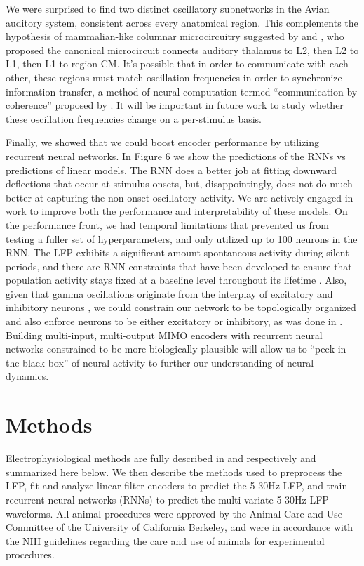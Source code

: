 We were surprised to find two distinct oscillatory subnetworks in the Avian auditory system, consistent across every anatomical region. This complements the hypothesis of mammalian-like columnar microcircuitry suggested by \cite{Wang2010} and \cite{Calabrese2015}, who proposed the canonical microcircuit connects auditory thalamus to L2, then L2 to L1, then L1 to region CM. It’s possible that in order to communicate with each other, these regions must match oscillation frequencies in order to synchronize information transfer, a method of neural computation termed “communication by coherence” proposed by \cite{Fries2005}. It will be important in future work to study whether these oscillation frequencies change on a per-stimulus basis.

Finally, we showed that we could boost encoder performance by utilizing recurrent neural networks. In Figure 6 we show the predictions of the RNNs vs predictions of linear models. The RNN does a better job at fitting downward deflections that occur at stimulus onsets, but, disappointingly, does not do much better at capturing the non-onset oscillatory activity. We are actively engaged in work to improve both the performance and interpretability of these models. On the performance front, we had temporal limitations that prevented us from testing a fuller set of hyperparameters, and only utilized up to 100 neurons in the RNN. The LFP exhibits a significant amount spontaneous activity during silent periods, and there are RNN constraints that have been developed to ensure that population activity stays fixed at a baseline level throughout its lifetime \cite{Krueger2015}. Also, given that gamma oscillations originate from the interplay of excitatory and inhibitory neurons \cite{Buzsaki2012a}, we could constrain our network to be topologically organized and also enforce neurons to be either excitatory or inhibitory, as was done in \cite{Song2016}. Building multi-input, multi-output MIMO encoders with recurrent neural networks constrained to be more biologically plausible will allow us to ``peek in the black box'' of neural activity to further our understanding of neural dynamics.


\section{Methods}


Electrophysiological methods are fully described in \cite{Elie2015a} and \cite{Elie2015b} respectively and summarized here below. We then describe the methods used to preprocess the LFP, fit and analyze linear filter encoders to predict the 5-30Hz LFP, and train recurrent neural networks (RNNs) to predict the multi-variate 5-30Hz LFP waveforms. All animal procedures were approved by the Animal Care and Use Committee of the University of California Berkeley, and were in accordance with the NIH guidelines regarding the care and use of animals for experimental procedures.

